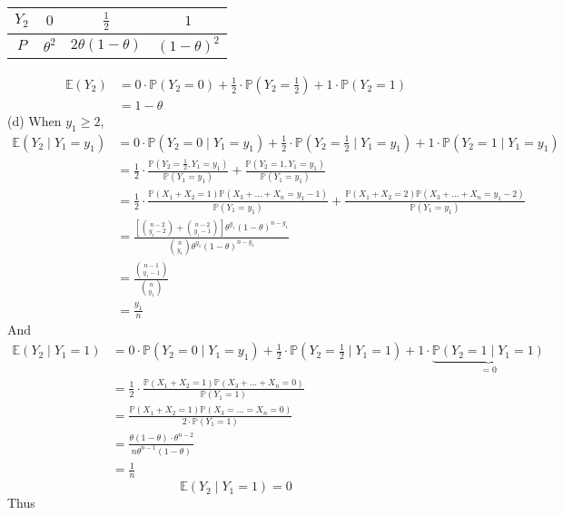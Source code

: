 \begin{table}[h]
	\centering
	\begin{tabular}{|c|c|c|c|}
		\hline
		$Y_2$ & $0$ & $\frac{1}{2}$ & $1$ \\
		\hline
		$P$ & $\theta^{2}$ & $2\theta(1-\theta)$ & $(1-\theta)^2$ \\
		\hline
	\end{tabular}
\end{table}
\[
\begin{aligned}
\mathbb{E}(Y_2) & =0\cdot \mathbb{P}(Y_2=0)+\frac{1}{2}\cdot \mathbb{P}\left( Y_2=\frac{1}{2} \right)+1\cdot \mathbb{P}(Y_2=1) \\
 & =1-\theta
\end{aligned}
\]
(d)
When $y_1\geq2$,
\[
\begin{aligned}
\mathbb{E}(Y_2 \mid Y_1=y_1) & =0\cdot \mathbb{P}(Y_2=0\mid Y_1=y_1)+\frac{1}{2}\cdot \mathbb{P}\left( Y_2=\frac{1}{2}\mid Y_1=y_1 \right)+1\cdot \mathbb{P}(Y_2 =1\mid Y_1=y_1)  \\
 & =\frac{1}{2}\cdot\frac{\mathbb{P}\left( Y_2=\frac{1}{2},Y_1=y_1 \right)}{\mathbb{P}(Y_1=y_1)}+\frac{\mathbb{P}(Y_2=1,Y_1=y_1)}{\mathbb{P}(Y_1=y_1)} \\
 & =\frac{1}{2}\cdot\frac{\mathbb{P}(X_1+X_2=1)\mathbb{P}(X_3+\dots+X_n=y_1-1)}{\mathbb{P}(Y_1=y_1)}+\frac{\mathbb{P}(X_1+X_2=2)\mathbb{P}(X_3+\dots+X_n=y_1-2)}{\mathbb{P}(Y_1=y_1)} \\
 & =\frac{[\binom{n-2}{y_1-2} +\binom{n-2}{y_1-1} ]\theta^{y_1}(1-\theta)^{n-y_1}}{\binom{n}{y_1} \theta^{y_1}(1-\theta)^{n-y_1}} \\
 & =\frac{\binom{n-1}{y_1-1} }{\binom{n}{y_1} } \\
 & =\frac{y_1}{n}
\end{aligned}
\]
And
\[
\begin{aligned}
\mathbb{E}(Y_2\mid Y_1=1) & =0\cdot \mathbb{P}(Y_2=0\mid Y_1=y_1)+\frac{1}{2}\cdot \mathbb{P}\left( Y_2=\frac{1}{2}\mid Y_1=1 \right)+1\cdot \underbrace{ \mathbb{P}(Y_2 =1\mid Y_1=1) }_{ =0 } \\
 & =\frac{1}{2}\cdot\frac{\mathbb{P}(X_1+X_2=1)\mathbb{P}(X_3+\dots+X_n=0)}{\mathbb{P}(Y_1=1)} \\
 & =\frac{\mathbb{P}(X_1+X_2=1)\mathbb{P}(X_3=\dots=X_n=0)}{2\cdot \mathbb{P}(Y_1=1)} \\
 & =\frac{\theta(1-\theta)\cdot\theta^{n-2}}{n\theta^{n-1}(1-\theta)} \\
 & =\frac{1}{n}
\end{aligned}
\]
\[
\mathbb{E}(Y_2 \mid Y_1=1)=0
\]
Thus

